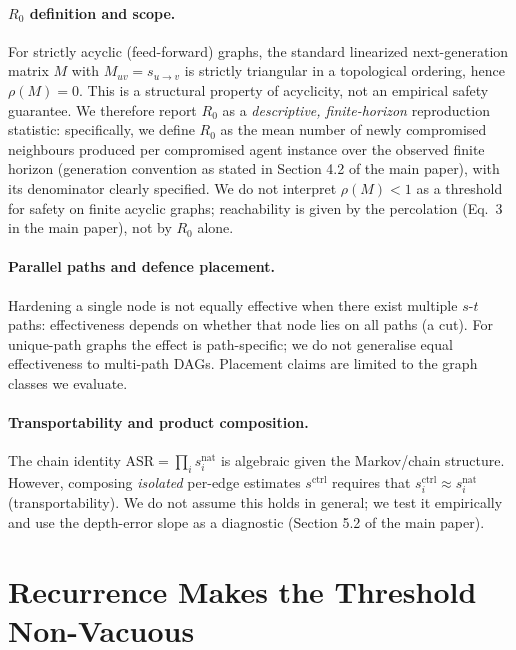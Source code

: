 \documentclass[sigconf,anonymous]{aamas}
\begin{document}
\paragraph{$R_0$ definition and scope.} For strictly acyclic (feed-forward) graphs, the
standard linearized next-generation matrix $M$ with $M_{uv}=s_{u\to v}$ is strictly
triangular in a topological ordering, hence $\rho(M)=0$. This is a structural property of
acyclicity, not an empirical safety guarantee. We therefore report $R_0$ as a
\emph{descriptive, finite-horizon} reproduction statistic: specifically, we define
$R_0$ as the mean number of newly compromised neighbours produced per compromised agent
instance over the observed finite horizon (generation convention as stated in
Section 4.2 of the main paper), with its denominator clearly specified. We do not
interpret $\rho(M)<1$ as a threshold for safety on finite acyclic graphs; reachability
is given by the percolation (Eq.~3 in the main paper), not by $R_0$ alone.

\paragraph{Parallel paths and defence placement.} Hardening a single node is not
equally effective when there exist multiple $s$-$t$ paths: effectiveness depends on
whether that node lies on all paths (a cut). For unique-path graphs the effect is
path-specific; we do not generalise equal effectiveness to multi-path DAGs. Placement
claims are limited to the graph classes we evaluate.

\paragraph{Transportability and product composition.} The chain identity
$\mathrm{ASR}=\prod_i s_i^{\mathrm{nat}}$ is algebraic given the Markov/chain
structure. However, composing \emph{isolated} per-edge estimates $s^{\mathrm{ctrl}}$
requires that $s^{\mathrm{ctrl}}_i \approx s^{\mathrm{nat}}_i$ (transportability). We do
not assume this holds in general; we test it empirically and use the depth-error slope
as a diagnostic (Section 5.2 of the main paper).

\section{Recurrence Makes the Threshold Non-Vacuous}
\label{app:cyclic}
\end{document}
